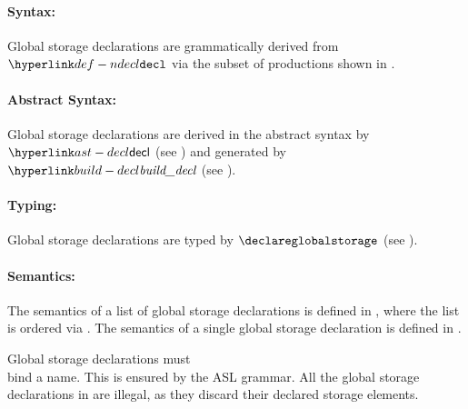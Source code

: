 \paragraph{Syntax:} Global storage declarations are grammatically derived from $\Ndecl$
  via the subset of productions shown in .

\paragraph{Abstract Syntax:} Global storage declarations are derived in the abstract syntax by $\decl$
  (see ) and generated by $\builddecl$ (see ).

\paragraph{Typing:} Global storage declarations are typed by $\declareglobalstorage$
(see ).

\paragraph{Semantics:} The semantics of a list of global storage declarations is defined in ,
  where the list is ordered via .
  The semantics of a single global storage declaration is defined in .

Global storage declarations must\\ bind a name.
This is ensured by the ASL grammar.
All the global storage declarations in  are illegal,
as they discard their declared storage elements.

